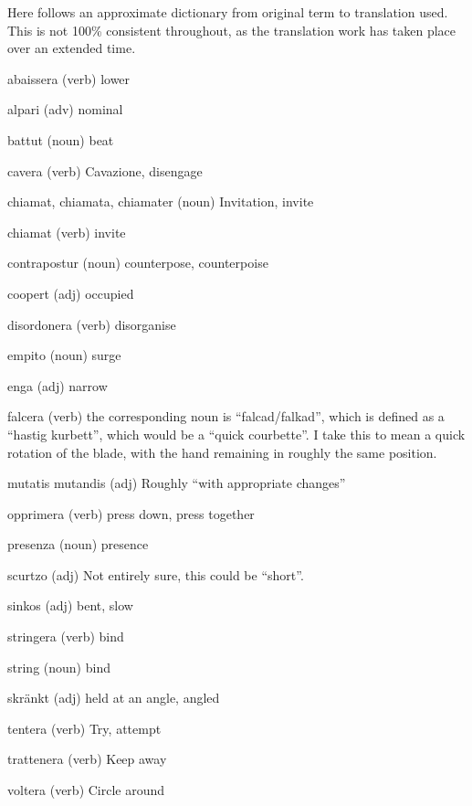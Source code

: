 \newpage
{}

Here follows an approximate dictionary from original term to translation used. This is not 100\% consistent throughout, as the translation work has taken place over an extended time.

\begin{description}
\item{abaissera} (verb) lower
\item{alpari} (adv) nominal
\item{battut} (noun) beat
\item{cavera} (verb) Cavazione, disengage
\item{chiamat, chiamata, chiamater} (noun) Invitation, invite
\item{chiamat} (verb) invite
\item{contrapostur} (noun) counterpose, counterpoise
\item{coopert} (adj) occupied
\item{disordonera} (verb) disorganise
\item{empito} (noun) surge
\item{enga} (adj) narrow
\item{falcera} (verb) the corresponding noun is ``falcad/falkad'', which is defined as a ``hastig kurbett'', which would be a ``quick courbette''. I take this to mean a quick rotation of the blade, with the hand remaining in roughly the same position.
\item{mutatis mutandis} (adj) Roughly ``with appropriate changes''
\item{opprimera} (verb) press down, press together
\item{presenza} (noun) presence
\item{scurtzo} (adj) Not entirely sure, this could be ``short''.
\item{sinkos} (adj) bent, slow
\item{stringera} (verb) bind
\item{string} (noun) bind
\item{skränkt} (adj) held at an angle, angled
\item{tentera} (verb) Try, attempt
\item{trattenera} (verb) Keep away
\item{voltera} (verb) Circle around
\end{description}
